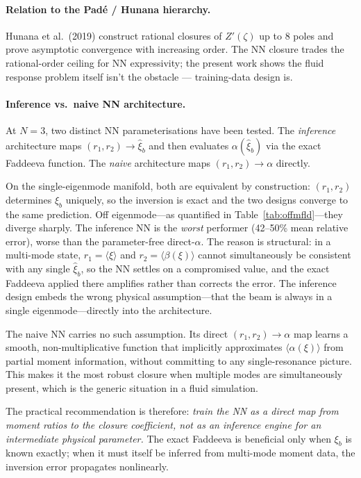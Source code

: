 \documentclass[11pt]{article}
\newcommand{\xib}{\xi_b}
\begin{document}
\paragraph{Relation to the Pad\'e / Hunana hierarchy.} Hunana et al.\
(2019) construct rational closures of $Z'(\zeta)$ up to 8 poles and prove
asymptotic convergence with increasing order. The NN closure trades the
rational-order ceiling for NN expressivity; the present work shows the
fluid response problem itself isn't the obstacle --- training-data design
is.

\paragraph{Inference vs.\ naive NN architecture.}
At $N=3$, two distinct NN parameterisations have been tested.  The
\emph{inference} architecture maps $(r_1,r_2)\to\hat\xib$ and then
evaluates $\alpha(\hat\xib)$ via the exact Faddeeva function.  The
\emph{naive} architecture maps $(r_1,r_2)\to\alpha$ directly.

On the single-eigenmode manifold, both are equivalent by construction:
$(r_1,r_2)$ determines $\xib$ uniquely, so the inversion is exact and
the two designs converge to the same prediction.  Off eigenmode---as
quantified in Table~\ref{tab:offmfld}---they diverge sharply.  The
inference NN is the \emph{worst} performer (42--50\% mean relative
error), worse than the parameter-free direct-$\alpha$.  The reason is
structural: in a multi-mode state, $r_1=\langle\xi\rangle$ and
$r_2=\langle\beta(\xi)\rangle$ cannot simultaneously be consistent with
any single $\hat\xib$, so the NN settles on a compromised value, and the
exact Faddeeva applied there amplifies rather than corrects the error.
The inference design embeds the wrong physical assumption---that the beam
is always in a single eigenmode---directly into the architecture.

The naive NN carries no such assumption.  Its direct $(r_1,r_2)\to\alpha$
map learns a smooth, non-multiplicative function that implicitly
approximates $\langle\alpha(\xi)\rangle$ from partial moment information,
without committing to any single-resonance picture.  This makes it the
most robust closure when multiple modes are simultaneously present, which
is the generic situation in a fluid simulation.

The practical recommendation is therefore: \emph{train the NN as a direct
map from moment ratios to the closure coefficient, not as an inference
engine for an intermediate physical parameter.}  The exact Faddeeva is
beneficial only when $\xib$ is known exactly; when it must itself be
inferred from multi-mode moment data, the inversion error propagates
nonlinearly.
\end{document}
